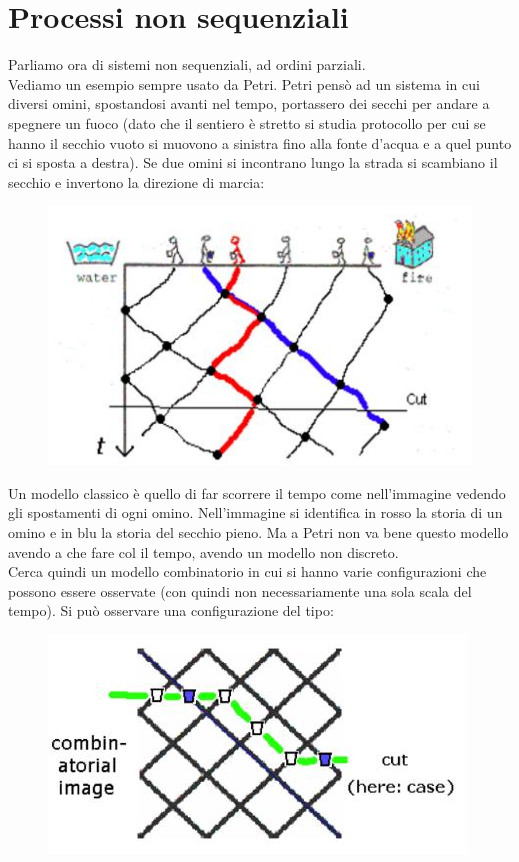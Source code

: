 \documentclass[a4paper,12pt, oneside]{book}
\begin{document}
\section{Processi non sequenziali}
Parliamo ora di sistemi non sequenziali, ad ordini parziali.\\
Vediamo un esempio sempre usato da Petri.
Petri pensò ad un sistema in cui diversi omini, spostandosi avanti nel tempo,
portassero dei secchi per andare a spegnere un fuoco (dato che il sentiero  è
stretto si studia protocollo per cui se hanno il secchio vuoto si muovono a
sinistra fino alla fonte d'acqua e a quel punto ci si sposta a destra). Se due
omini si incontrano lungo la strada si scambiano 
il secchio e invertono la direzione di marcia:
\begin{figure}[H]
  \centering
  \includegraphics[scale = 0.5]{img/fire.jpg} 
\end{figure}
Un modello classico è quello di far scorrere il tempo come nell'immagine vedendo
gli spostamenti di ogni omino. Nell'immagine si identifica in rosso la storia di
un omino e in blu la storia del secchio pieno.
Ma a Petri non va bene questo modello avendo a che fare col il 
tempo, avendo un modello non discreto.\\
Cerca quindi un modello combinatorio in cui si hanno varie
configurazioni che possono essere osservate (con quindi non necessariamente una
sola scala del tempo).
Si può osservare una configurazione del tipo:
\begin{figure}[H]
  \centering
  \includegraphics[scale = 0.5]{img/fire2.jpg} 
\end{figure}
\end{document}

